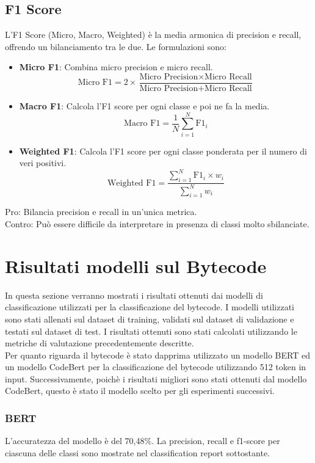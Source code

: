 \documentclass[../../Thesis.tex]{subfiles}
\begin{document}
\subsection*{F1 Score}
L'F1 Score (Micro, Macro, Weighted) è la media armonica di precision e recall, offrendo un bilanciamento tra le due. Le formulazioni sono:
\begin{itemize}
    \item \textbf{Micro F1}: Combina micro precision e micro recall.
    $$ \text{Micro F1} = 2 \times \frac{\text{Micro Precision} \times \text{Micro Recall}}{\text{Micro Precision} + \text{Micro Recall}} $$
    \item \textbf{Macro F1}: Calcola l'F1 score per ogni classe e poi ne fa la media.
    $$ \text{Macro F1} = \frac{1}{N} \sum_{i=1}^{N} \text{F1}_i $$
    \item \textbf{Weighted F1}: Calcola l'F1 score per ogni classe ponderata per il numero di veri positivi.
    $$ \text{Weighted F1} = \frac{\sum_{i=1}^{N} \text{F1}_i \times w_i}{\sum_{i=1}^{N} w_i} $$
\end{itemize}
Pro: Bilancia precision e recall in un'unica metrica.\\
Contro: Può essere difficile da interpretare in presenza di classi molto sbilanciate.

 
\section{Risultati modelli sul Bytecode}
In questa sezione verranno mostrati i risultati ottenuti dai modelli di classificazione utilizzati per la classificazione del bytecode. I modelli utilizzati sono stati allenati sul dataset di training, validati sul dataset di validazione e testati sul dataset di test. I risultati ottenuti sono stati calcolati utilizzando le metriche di valutazione precedentemente descritte.\\
Per quanto riguarda il bytecode è stato dapprima utilizzato un modello BERT ed un modello CodeBert per la classificazione del bytecode utilizzando 512 token in input. Successivamente, poichè i risultati migliori sono stati ottenuti dal modello CodeBert, questo è stato il modello scelto per gli esperimenti successivi.\\
\subsubsection{BERT}
L'accuratezza del modello è del 70,48\%. La precision, recall e f1-score per ciascuna delle classi sono mostrate nel classification report sottostante.\\
\end{document}
